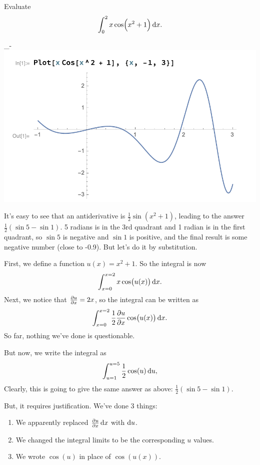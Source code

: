 \begin{example}
  Evaluate
  \begin{align*}
    \int_{0}^{2} x\cos(x^2 + 1) \dx.
  \end{align*}
  \begin{mdframed}
    _-\includegraphics[width=400pt]{img/calculus-integration-by-substitution-example-1.png}
  \end{mdframed}

  It's easy to see that an antiderivative is $\frac{1}{2}\sin(x^2 + 1)$, leading to the answer
  $\frac{1}{2}(\sin 5 - \sin 1)$. 5 radians is in the 3rd quadrant and 1 radian is in the first
  quadrant, so $\sin 5$ is negative and $\sin 1$ is positive, and the final result is some negative
  number (close to -0.9). But let's do it by substitution.

  First, we define a function $u(x) = x^2 + 1$. So the integral is now
  \begin{align*}
    \int_{x=0}^{x=2} x\cos(u(x)) \dx.
  \end{align*}
  Next, we notice that $\frac{\partial u}{\partial x} = 2x$, so the integral can be written as
  \begin{align}
    \int_{x=0}^{x=2} \frac{1}{2} \dudx \cos(u(x)) \dx. \label{xx}
  \end{align}
  So far, nothing we've done is questionable.

  But now, we write the integral as
  \begin{align*}
    \int_{u=1}^{u=5} \frac{1}{2} \cos(u) \du,
  \end{align*}
  Clearly, this is going to give the same answer as above: $\frac{1}{2}(\sin 5 - \sin 1)$.

  But, it requires justification. We've done 3 things:
  \begin{enumerate}
  \item We apparently replaced $\dudx \dx$ with $\du$.
  \item We changed the integral limits to be the corresponding $u$ values.
  \item We wrote $\cos(u)$ in place of $\cos(u(x))$.
  \end{enumerate}


\end{example}
